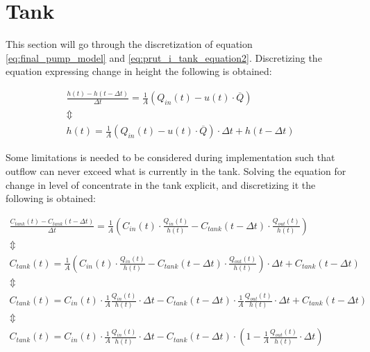 \section{Tank}\label{sec:tank}

This section will go through the discretization of equation \ref{eq:final_pump_model} and \ref{eq:prut_i_tank_equation2}.
Discretizing the equation expressing change in height the following is obtained:

\begin{equation}\label{eq:disc_tank}
\begin{array}{l}
	\frac{h(t)-h(t-\Delta t)}{\Delta t} = \frac{1}{A} (Q_{in}(t) - u(t)\cdot \overline Q) \\
	\Updownarrow \\
	h(t) = \frac{1}{A} (Q_{in}(t) - u(t)\cdot \overline Q) \cdot \Delta t + h(t-\Delta t)	
\end{array}
\end{equation}

Some limitations is needed to be considered during implementation such that outflow can never exceed what is currently in the tank.
Solving the equation for change in level of concentrate in the tank explicit, and discretizing it the following is obtained:

\begin{equation}\label{eq:disc_con_tank}
\begin{array}{l}
	\frac{C_{tank}(t)-C_{tank}(t-\Delta t)}{\Delta t} = \frac{1}{A} \left(C_{in}(t) \cdot \frac{Q_{in}(t)}{h(t)} - C_{tank}(t - \Delta t) \cdot \frac{Q_{out}(t)}{h(t)} \right) \\
	
	\Updownarrow \\
	
	C_{tank}(t) = \frac{1}{A} \left(C_{in}(t) \cdot \frac{Q_{in}(t)}{h(t)} - C_{tank}(t - \Delta t) \cdot \frac{Q_{out}(t)}{h(t)} \right) \cdot \Delta t + C_{tank}(t-\Delta t) \\

	\Updownarrow \\

	C_{tank}(t) =  C_{in}(t) \cdot \frac{1}{A} \frac{Q_{in}(t)}{h(t)} \cdot \Delta t -  C_{tank}(t - \Delta t) \cdot \frac{1}{A} \frac{Q_{out}(t)}{h(t)} \cdot \Delta t + C_{tank}(t - \Delta t) \\

	\Updownarrow \\

	C_{tank}(t) =   C_{in}(t) \cdot \frac{1}{A} \frac{Q_{in}(t)}{h(t)} \cdot \Delta t -  C_{tank}(t - \Delta t) \cdot \left( 1 - \frac{1}{A} \frac{Q_{out}(t)}{h(t)} \cdot \Delta t \right)

\end{array}
\end{equation}

